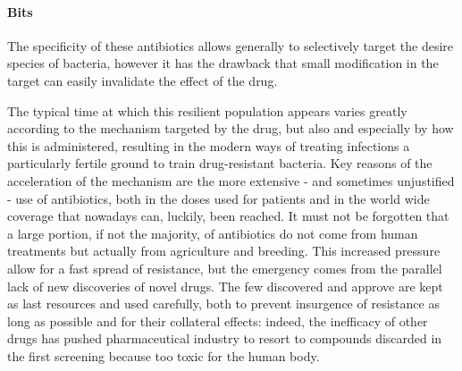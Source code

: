 \clearpage





\paragraph{Bits}

The specificity of these antibiotics allows generally to selectively target the desire species of bacteria, however it has the drawback that small modification in the target can easily invalidate the effect of the drug. 

The typical time at which this resilient population appears varies greatly according to the mechanism targeted by the drug, but also and especially by how this is administered, resulting in the modern ways of treating infections a particularly fertile ground to train drug-resistant bacteria. Key reasons of the acceleration of the mechanism are the more extensive - and sometimes unjustified - use of antibiotics, both in the doses used for patients and in the world wide coverage that nowadays can, luckily, been reached. It must not be forgotten that a large portion, if not the majority, of antibiotics do not come from human treatments but actually from agriculture and breeding.
%
This increased pressure allow for a fast spread of resistance, but the emergency comes from the parallel lack of new discoveries of novel drugs. The few discovered and approve are kept as last resources and used carefully, both to prevent insurgence of resistance as long as possible and for their collateral effects: indeed, the inefficacy of other drugs has pushed pharmaceutical industry to resort to compounds discarded in the first screening because too toxic for the human body.





